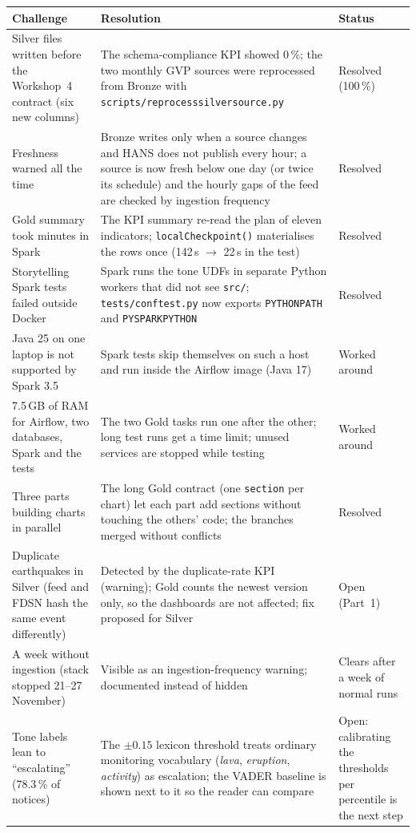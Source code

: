 \documentclass[11pt,a4paper]{article}
\renewcommand{\_}{\textunderscore\allowbreak}
\begin{document}
\begin{longtable}{L{4.2cm}L{6.4cm}L{3.6cm}}
\toprule
\textbf{Challenge} & \textbf{Resolution} & \textbf{Status}\\
\midrule\endhead
Silver files written before the Workshop~4 contract (six new columns) & The schema-compliance KPI showed 0\,\%; the two monthly GVP sources were reprocessed from Bronze with \texttt{scripts/reprocess\_silver\_source.py} & Resolved (100\,\%)\\
Freshness warned all the time & Bronze writes only when a source changes and HANS does not publish every hour; a source is now fresh below one day (or twice its schedule) and the hourly gaps of the feed are checked by ingestion frequency & Resolved\\
Gold summary took minutes in Spark & The KPI summary re-read the plan of eleven indicators; \texttt{localCheckpoint()} materialises the rows once (142\,s $\rightarrow$ 22\,s in the test) & Resolved\\
Storytelling Spark tests failed outside Docker & Spark runs the tone UDFs in separate Python workers that did not see \texttt{src/}; \texttt{tests/conftest.py} now exports \texttt{PYTHONPATH} and \texttt{PYSPARK\_PYTHON} & Resolved\\
Java 25 on one laptop is not supported by Spark 3.5 & Spark tests skip themselves on such a host and run inside the Airflow image (Java 17) & Worked around\\
7.5\,GB of RAM for Airflow, two databases, Spark and the tests & The two Gold tasks run one after the other; long test runs get a time limit; unused services are stopped while testing & Worked around\\
Three parts building charts in parallel & The long Gold contract (one \texttt{section} per chart) let each part add sections without touching the others' code; the branches merged without conflicts & Resolved\\
Duplicate earthquakes in Silver (feed and FDSN hash the same event differently) & Detected by the duplicate-rate KPI (warning); Gold counts the newest version only, so the dashboards are not affected; fix proposed for Silver & Open (Part~1)\\
A week without ingestion (stack stopped 21--27 November) & Visible as an ingestion-frequency warning; documented instead of hidden & Clears after a week of normal runs\\
Tone labels lean to ``escalating'' (78.3\,\% of notices) & The $\pm0.15$ lexicon threshold treats ordinary monitoring vocabulary (\emph{lava}, \emph{eruption}, \emph{activity}) as escalation; the VADER baseline is shown next to it so the reader can compare & Open: calibrating the thresholds per percentile is the next step\\
\bottomrule
\end{longtable}
\end{document}
